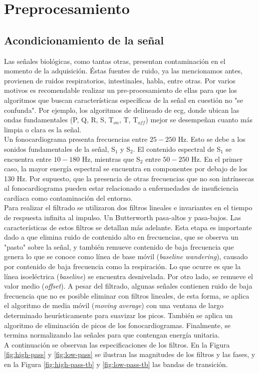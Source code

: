 \chapter{Preprocesamiento}

\section{Acondicionamiento de la señal}

Las señales biológicas, como tantas otras, presentan contaminación en el momento de la adquisición. Éstas fuentes de
ruido, ya las mencionamos antes, provienen de ruidos respiratorios, intestinales, habla, entre otras. Por varios
motivos es recomendable realizar un pre-procesamiento de ellas para que los algoritmos que buscan características
específicas de la señal en cuestión no "se confunda". Por ejemplo, los algoritmos de delineado de \acrshort{ecg},
donde ubican las ondas fundamentales (P, Q, R, S, T$_{on}$, T, T$_{off}$) mejor se desempeñan cuanto más limpia o
clara es la señal. \\
\indent Un fonocardiograma presenta frecuencias entre $25-250$ Hz. Esto se debe a los sonidos fundamentales de la
señal, S$_1$ y S$_2$. El contenido espectral de S$_1$ se encuentra entre $10-180$ Hz, mientras que S$_2$ entre
$50-250$ Hz. En el primer caso, la mayor energía espectral se encuentra en componentes por debajo de los 130 Hz. Por
supuesto, que la presencia de otras frecuencias que no son intrínsecas al fonocardiograma pueden estar relacionado a
enfermedades de insuficiencia cardíaca como contaminación del entorno. \\
\indent Para realizar el filtrado se utilizaron dos filtros lineales e invariantes en el tiempo de respuesta
infinita al impulso. Un Butterworth pasa-altos y pasa-bajos. Las características de estos filtros se detallan más
adelante. Esta etapa es importante dado a que elimina ruido de contenido alto en frecuencias, que se observa un
"pasto" sobre la señal, y también remueve contenido de baja frecuencia que genera lo que se conoce como línea de
base móvil (\textit{baseline wandering}), causado por contenido de baja frecuencia como la respiración. Lo que
ocurre es que la línea isoeléctrica (\textit{baseline}) se encuentra desnivelada. Por otro lado, se remueve el valor
medio (\textit{offset}). A pesar del filtrado, algunas señales contienen ruido de baja frecuencia que no es posible
eliminar con filtros lineales, de esta forma, se aplica el algoritmo de media móvil (\textit{moving average}) con
una ventana de largo determinado heurísticamente para suavizar los picos. También se aplica un algoritmo de
eliminación de picos de los fonocardiogramas. Finalmente, se termina normalizando las señales para que contengan
energía unitaria. \\
\indent A continuación se observan las especificaciones de los filtros. En la Figura \ref{fig:high-pass} y
\ref{fig:low-pass} se ilustran las magnitudes de los filtros y las fases, y en la Figura \ref{fig:high-pass-tb} y
\ref{fig:low-pass-tb} las bandas de transición.

